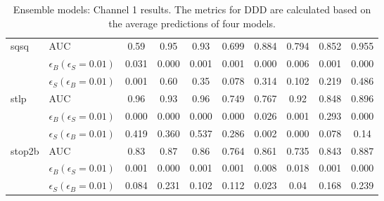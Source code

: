 \begin{table}[H]
\begin{tabular}{ll|ccc|cc|ccc}
    \hline
    \multirow{3}{*}{sqsq} & AUC & 0.59 & 0.95 & 0.93 & 0.699 & 0.884 & 0.794 & 0.852 & 0.955 \\
    & $\epsilon_B(\epsilon_S=0.01)$ & 0.031 & 0.000 & 0.001 & 0.001 & 0.000 & 0.006 & 0.001 & 0.000 \\
    & $\epsilon_S(\epsilon_B=0.01)$ & 0.001 & 0.60 & 0.35 & 0.078 & 0.314 & 0.102 & 0.219 & 0.486 \\
    \hline
    \multirow{3}{*}{stlp} & AUC & 0.96 & 0.93 & 0.96 & 0.749 & 0.767 & 0.92 & 0.848 & 0.896 \\
    & $\epsilon_B(\epsilon_S=0.01)$ & 0.000 & 0.000 & 0.000 & 0.000 & 0.026 & 0.001 & 0.293 & 0.000 \\
    & $\epsilon_S(\epsilon_B=0.01)$ & 0.419 & 0.360 & 0.537 & 0.286 & 0.002 & 0.000 & 0.078 & 0.14 \\
    \hline
    \multirow{3}{*}{stop2b} & AUC & 0.83 & 0.87 & 0.86 & 0.764 & 0.861 & 0.735 & 0.843 & 0.887 \\
    & $\epsilon_B(\epsilon_S=0.01)$ & 0.001 & 0.000 & 0.001 & 0.001 & 0.008 & 0.018 & 0.001 & 0.000 \\
    & $\epsilon_S(\epsilon_B=0.01)$ & 0.084 & 0.231 & 0.102 & 0.112 & 0.023 & 0.04 & 0.168 & 0.239 \\
    \hline  
    \end{tabular}
    \caption{Ensemble models: Channel 1 results. The metrics for DDD are calculated based on the average predictions of four models.}
    \label{tab:ch1_all}
    \end{table}